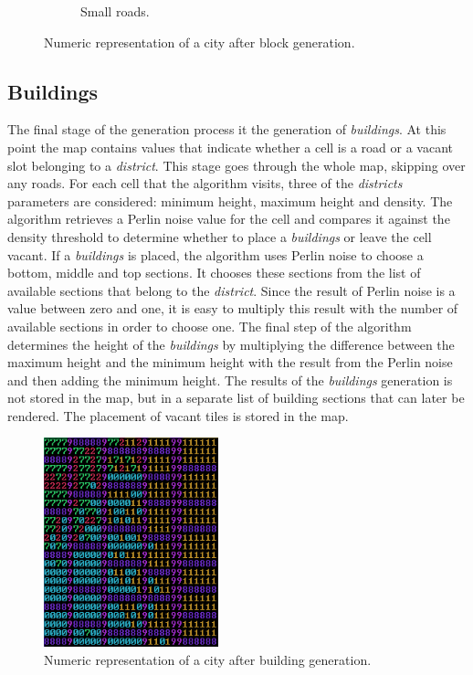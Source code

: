 \begin{figure}[h]
\begin{subfigure}{0.5\textwidth}
			\caption{Small roads.}
			\label{fig:map-small-roads}
		\end{subfigure}
		\caption{Numeric representation of a city after block generation.}
		\label{fig:map-main-and-small-roads}
	\end{figure}
		
	\subsection{Buildings}
		The final stage of the generation process it the generation of \textit{buildings}. At this point the map contains values that indicate whether a cell is a road or a vacant slot belonging to a \textit{district}. This stage goes through the whole map, skipping over any roads. For each cell that the algorithm visits, three of the \textit{districts} parameters are considered: minimum height, maximum height and density. The algorithm retrieves a Perlin noise value for the cell and compares it against the density threshold to determine whether to place a \textit{buildings} or leave the cell vacant. If a \textit{buildings} is placed, the algorithm uses Perlin noise to choose a bottom, middle and top sections. It chooses these sections from the list of available sections that belong to the \textit{district}. Since the result of Perlin noise is a value between zero and one, it is easy to multiply this result with the number of available sections in order to choose one. The final step of the algorithm determines the height of the \textit{buildings} by multiplying the difference between the maximum height and the minimum height with the result from the Perlin noise and then adding the minimum height. The results of the \textit{buildings} generation is not stored in the map, but in a separate list of building sections that can later be rendered. The placement of vacant tiles is stored in the map.
		
	\begin{figure}
		\centering
		\includegraphics[width=0.45\textwidth]{"Images/map grass colored"}
		\caption{Numeric representation of a city after building generation.}
		\label{fig:map-grass}
	\end{figure}

